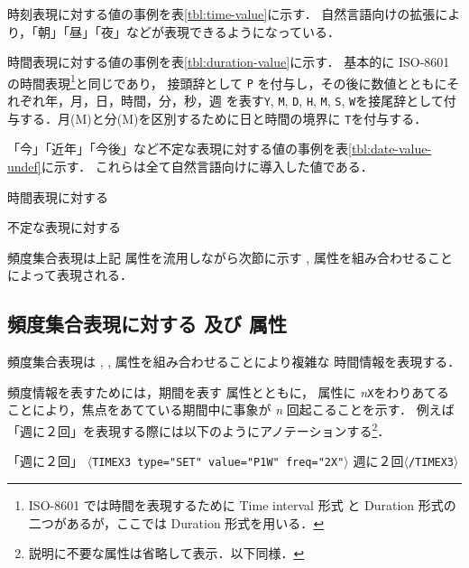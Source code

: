 \documentclass[japanese]{jnlp_1.4}
\newcommand{\modified}[1]{}
\def\value{}
\def\valuefromsurface{}
\def\freq{}
\def\quant{}
\begin{document}
時刻表現に対する値の事例を表\ref{tbl:time-value}に示す．
自然言語向けの拡張により，「朝」「昼」「夜」などが表現できるようになっている．
\modified{* が付与されている「未明」と「深夜」は日本語新聞記事に頻出したため
に \valuefromsurface の値を独自に導入した．
\value にはどちらも「夜」と同じく {\tt TNI}をわり
あてる．
詳しくは 5.3 節で説明する．}

時間表現に対する値の事例を表\ref{tbl:duration-value}に示す．
基本的に ISO-8601 の時間表現\footnote{ISO-8601 では時間を表現するために Time
  interval 形式 と Duration 形式の二つがあるが，ここでは Duration 形式を用いる．}と同じであり，
接頭辞として {\tt P} を付与し，その後に数値とともにそれぞれ年，月，日，時間，分，秒，週
を表す{\tt Y}, {\tt M}, {\tt D}, {\tt H}, {\tt M}, {\tt S}, {\tt W}を接尾辞として付与する．月(M)と分(M)を区別するために日と時間の境界に {\tt T}を付与する．

「今」「近年」「今後」など不定な表現に対する値の事例を表\ref{tbl:date-value-undef}に示す．
これらは全て自然言語向けに導入した値である．

\begin{table}[b]
\begin{minipage}[t]{0.5\textwidth}
\caption{時間表現に対する \value}
\label{tbl:duration-value}

\end{minipage}
\begin{minipage}[t]{0.5\textwidth}
\caption{不定な表現に対する \value}
\label{tbl:date-value-undef}

\end{minipage}
\end{table}

頻度集合表現は上記 \value 属性を流用しながら次節に示す \freq, \quant 属性を組み合わせることによって表現される．


\subsection{頻度集合表現に対する \freq 及び \quant 属性 \label{subsec:freqquant}}

頻度集合表現は \value, \freq, \quant 属性を組み合わせることにより複雑な
時間情報を表現する．

頻度情報を表すためには，期間を表す \value 属性とともに， \freq 属性に {\it n}{\tt X}をわりあてることにより，焦点をあてている期間中に事象が {\it n} 回起こることを示す．
例えば「週に２回」を表現する際には以下のようにアノテーションする\footnote{説明に不要な属性は省略して表示．以下同様．}．

{\addtolength{\linewidth}{-6zw}\setlength{\leftskip}{3zw}
\begin{itembox}[l]{「週に２回」}
{\small
{\tt $\langle$TIMEX3 type="SET" value="P1W" freq="2X"$\rangle$} 
週に２回{\tt $\langle$/TIMEX3$\rangle$}}
\end{itembox}
\par}
\end{document}
